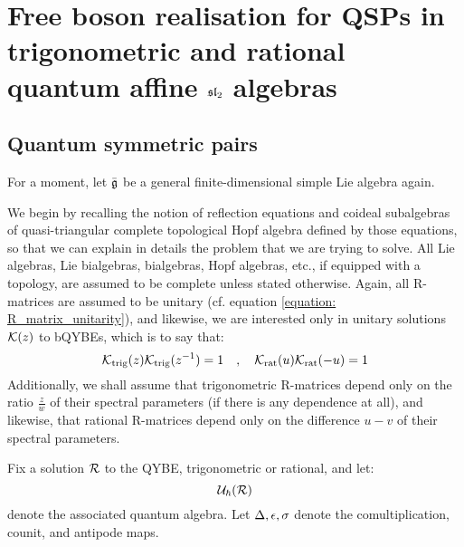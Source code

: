 \section{\texorpdfstring{Free boson realisation for QSPs in trigonometric and rational quantum affine $\sl_2$ algebras}{}}
    \subsection{Quantum symmetric pairs}
        For a moment, let $\bar{\g}$ be a general finite-dimensional simple Lie algebra again.
    
        We begin by recalling the notion of reflection equations and coideal subalgebras of quasi-triangular complete topological Hopf algebra defined by those equations, so that we can explain in details the problem that we are trying to solve. All Lie algebras, Lie bialgebras, bialgebras, Hopf algebras, etc., if equipped with a topology, are assumed to be complete unless stated otherwise. Again, all R-matrices are assumed to be unitary (cf. equation \eqref{equation: R_matrix_unitarity}), and likewise, we are interested only in unitary solutions $\calK(z)$ to bQYBEs, which is to say that:
            \begin{equation} \label{equation: K_matrix_unitarity}
                \calK_{\trigonometric}(z) \calK_{\trigonometric}(z^{-1}) = 1 \quad, \quad \calK_{\rational}(u) \calK_{\rational}(-u) = 1
            \end{equation}
        Additionally, we shall assume that trigonometric R-matrices depend only on the ratio $\frac{z}{w}$ of their spectral parameters (if there is any dependence at all), and likewise, that rational R-matrices depend only on the difference $u - v$ of their spectral parameters.

        Fix a solution $\calR$ to the QYBE, trigonometric or rational, and let:
            $$\calU_{\hbar}(\calR)$$
        denote the associated quantum algebra. Let $\Delta, \e, \sigma$ denote the comultiplication, counit, and antipode maps.
        
